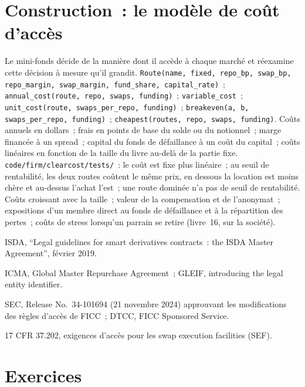 \section{Construction~: le modèle de coût d'accès}\label{bld:m2:getting-access-rates-credit:clearcost}

\begin{build}
 Le mini-fonds décide de la manière dont il accède à chaque marché et
réexamine cette décision à mesure qu'il grandit.  \texttt{Route(name, fixed, repo\_bp, swap\_bp, repo\_margin,
swap\_margin, fund\_share, capital\_rate)}~; \texttt{annual\_cost(route, repo, swaps,
funding)}~; \texttt{variable\_cost}~; \texttt{unit\_cost(route, swaps\_per\_repo,
funding)}~; \texttt{breakeven(a, b, swaps\_per\_repo, funding)}~; \texttt{cheapest(routes,
repo, swaps, funding)}.
 Coûts annuels en dollars~; frais en points de base du solde ou du notionnel~;
marge financée à un spread~; capital du fonds de défaillance à un coût du capital~; coûts linéaires
en fonction de la taille du livre au-delà de la partie fixe.
 \texttt{code/firm/clearcost/tests/}~: le coût est fixe plus
linéaire~; au seuil de rentabilité, les deux routes coûtent le même prix, en dessous la location est
moins chère et au-dessus l'achat l'est~; une route dominée n'a pas de seuil de rentabilité.
 Coûts croissant avec la taille~; valeur de la compensation et de l'anonymat~;
expositions d'un membre direct au fonds de défaillance et à la répartition des pertes~; coûts de stress lorsqu'un
parrain se retire (livre~16, sur la société).
\end{build}

\begin{omsources}
\item ISDA, ``Legal guidelines for smart derivatives contracts~: the ISDA Master
Agreement'', février 2019.
\item ICMA, Global Master Repurchase Agreement~; GLEIF, introducing the legal entity
identifier.
\item SEC, Release No.~34-101694 (21 novembre 2024) approuvant les modifications des règles d'accès de FICC~;
DTCC, FICC Sponsored Service.
\item 17 CFR 37.202, exigences d'accès pour les swap execution facilities (SEF).
\end{omsources}

\section{Exercices}

